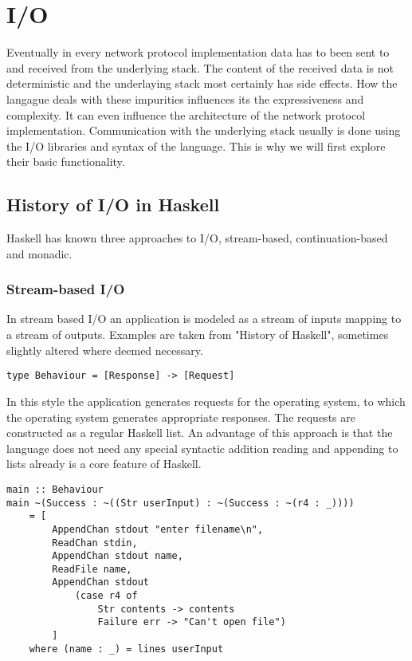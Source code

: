 \chapter{I/O}
Eventually in every network protocol implementation data has to been sent to and received from the underlying stack. The content of the received data is not deterministic and the underlaying stack most certainly has side effects. How the langague deals with these impurities influences its the expressiveness and complexity. It can even influence the architecture of the network protocol implementation.
Communication with the underlying stack usually is done using the I/O libraries and syntax of the language. This is why we will first explore their basic functionality.
\section{History of I/O in Haskell}
Haskell has known three approaches to I/O, stream-based, continuation-based and monadic.
\subsection{Stream-based I/O}
In stream based I/O an application is modeled as a stream of inputs mapping to a stream of outputs. Examples are taken from "History of Haskell", sometimes slightly altered where deemed necessary. %

\begin{lstlisting}[caption={Mapping of responses to requests}]
type Behaviour = [Response] -> [Request]
\end{lstlisting}

In this style the application generates requests for the operating system, to which the operating system generates appropriate responses. The requests are constructed as a regular Haskell list. An advantage of this approach is that the language does not need any special syntactic addition reading and appending to lists already is a core feature of Haskell.

\begin{lstlisting}[caption={Example of stream-based I/O in Haskell}]
main :: Behaviour
main ~(Success : ~((Str userInput) : ~(Success : ~(r4 : _))))
	= [
		AppendChan stdout "enter filename\n",
		ReadChan stdin,
		AppendChan stdout name,
		ReadFile name,
		AppendChan stdout
			(case r4 of
				Str contents -> contents
				Failure err -> "Can't open file")
		]
	where (name : _) = lines userInput
\end{lstlisting}
